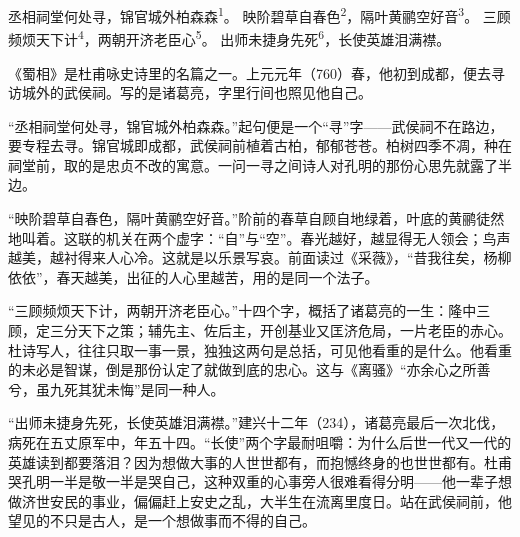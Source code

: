 
\begin{poem}
丞相祠堂何处寻，锦官城外柏森森\textsuperscript{1}。
映阶碧草自春色\textsuperscript{2}，隔叶黄鹂空好音\textsuperscript{3}。
三顾频烦天下计\textsuperscript{4}，两朝开济老臣心\textsuperscript{5}。
出师未捷身先死\textsuperscript{6}，长使英雄泪满襟。
\end{poem}

\begin{annotations}
\end{annotations}

\begin{appreciation}
《蜀相》是杜甫咏史诗里的名篇之一。上元元年（760）春，他初到成都，便去寻访城外的武侯祠。写的是诸葛亮，字里行间也照见他自己。

“丞相祠堂何处寻，锦官城外柏森森。”起句便是一个“寻”字——武侯祠不在路边，要专程去寻。锦官城即成都，武侯祠前植着古柏，郁郁苍苍。柏树四季不凋，种在祠堂前，取的是忠贞不改的寓意。一问一寻之间诗人对孔明的那份心思先就露了半边。

“映阶碧草自春色，隔叶黄鹂空好音。”阶前的春草自顾自地绿着，叶底的黄鹂徒然地叫着。这联的机关在两个虚字：“自”与“空”。春光越好，越显得无人领会；鸟声越美，越衬得来人心冷。这就是以乐景写哀。前面读过《采薇》，“昔我往矣，杨柳依依”，春天越美，出征的人心里越苦，用的是同一个法子。

“三顾频烦天下计，两朝开济老臣心。”十四个字，概括了诸葛亮的一生：隆中三顾，定三分天下之策；辅先主、佐后主，开创基业又匡济危局，一片老臣的赤心。杜诗写人，往往只取一事一景，独独这两句是总括，可见他看重的是什么。他看重的未必是智谋，倒是那份认定了就做到底的忠心。这与《离骚》“亦余心之所善兮，虽九死其犹未悔”是同一种人。

“出师未捷身先死，长使英雄泪满襟。”建兴十二年（234），诸葛亮最后一次北伐，病死在五丈原军中，年五十四。“长使”两个字最耐咀嚼：为什么后世一代又一代的英雄读到都要落泪？因为想做大事的人世世都有，而抱憾终身的也世世都有。杜甫哭孔明一半是敬一半是哭自己，这种双重的心事旁人很难看得分明——他一辈子想做济世安民的事业，偏偏赶上安史之乱，大半生在流离里度日。站在武侯祠前，他望见的不只是古人，是一个想做事而不得的自己。
\end{appreciation}
